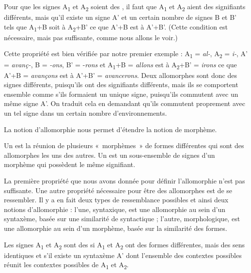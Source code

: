 {Pour que les signes A\textsubscript{1} et A\textsubscript{2} soient des , il faut que A\textsubscript{1} et A\textsubscript{2} aient des signifiants différents, mais qu’il existe un signe A’ et un certain nombre de signes B et B’ tels que A\textsubscript{1}+B soit à A\textsubscript{2}+B’ ce que A’+B est à A’+B’. (Cette condition est nécessaire, mais pas suffisante, comme nous allons le voir.)}

Cette propriété est bien vérifiée par notre premier exemple : A\textsubscript{1} = \textit{al-}, A\textsubscript{2} = \textit{i-}, A’ = \textit{avanç-}, B = \textit{{}-ons}, B’ = -\textit{rons} et A\textsubscript{1}+B = \textit{allons} est à A\textsubscript{2}+B’ = \textit{irons} ce que A’+B = \textit{avançons} est à A’+B’ = \textit{avancerons}. Deux allomorphes sont donc des signes différents, puisqu’ils ont des signifiants différents, mais ils se comportent ensemble comme s’ils formaient un unique signe, puisqu’ils commutent avec un même signe A’. On traduit cela en demandant qu’ils commutent proprement avec un tel signe dans un certain nombre d’environnements.

La notion d’allomorphie nous permet d’étendre la notion de morphème.

{Un  est la réunion de plusieurs «~morphèmes~» de formes différentes qui sont des allomorphes les uns des autres. Un  est un sous-ensemble de signes d’un morphème qui possèdent le même signifiant.}

La première propriété que nous avons donnée pour définir l’allomorphie n’est pas suffisante. Une autre propriété nécessaire pour être des allomorphes est de se ressembler. Il y a en fait deux types de ressemblance possibles et ainsi deux notions d’allomorphie : l’une, syntaxique, est une allomorphie au sein d’un syntaxème, basée sur une similarité de syntactique ; l’autre, morphologique, est une allomorphie au sein d’un morphème, basée sur la similarité des formes.

{Les signes A\textsubscript{1} et A\textsubscript{2} sont des  si A\textsubscript{1} et A\textsubscript{2} ont des formes différentes, mais des sens identiques et s’il existe un syntaxème A’ dont l’ensemble des contextes possibles réunit les contextes possibles de A\textsubscript{1} et A\textsubscript{2}.}

